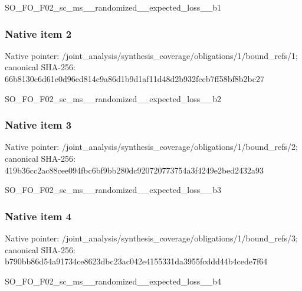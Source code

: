\documentclass[10pt,a4paper]{article}
\begin{document}
\begingroup\raggedright\sloppy SO\_\allowbreak{}FO\_\allowbreak{}F02\_\allowbreak{}sc\_\allowbreak{}ms\_\allowbreak{}\_\allowbreak{}randomized\_\allowbreak{}\_\allowbreak{}expected\_\allowbreak{}loss\_\allowbreak{}\_\allowbreak{}b1\par\endgroup

\subsubsection{Native item 2}
Native pointer: /joint\_\allowbreak{}analysis/synthesis\_\allowbreak{}coverage/obligations/1/bound\_\allowbreak{}refs/1; canonical SHA-256: 66b8130c6d61e0d96ed814c9a86d1b9d1af11d48d2b932fccb7ff58bf8b2bc27

\begingroup\raggedright\sloppy SO\_\allowbreak{}FO\_\allowbreak{}F02\_\allowbreak{}sc\_\allowbreak{}ms\_\allowbreak{}\_\allowbreak{}randomized\_\allowbreak{}\_\allowbreak{}expected\_\allowbreak{}loss\_\allowbreak{}\_\allowbreak{}b2\par\endgroup

\subsubsection{Native item 3}
Native pointer: /joint\_\allowbreak{}analysis/synthesis\_\allowbreak{}coverage/obligations/1/bound\_\allowbreak{}refs/2; canonical SHA-256: 419b36cc2ac88cee094fbc6bf9bb280dc920720773754a3f4249e2bed2432a93

\begingroup\raggedright\sloppy SO\_\allowbreak{}FO\_\allowbreak{}F02\_\allowbreak{}sc\_\allowbreak{}ms\_\allowbreak{}\_\allowbreak{}randomized\_\allowbreak{}\_\allowbreak{}expected\_\allowbreak{}loss\_\allowbreak{}\_\allowbreak{}b3\par\endgroup

\subsubsection{Native item 4}
Native pointer: /joint\_\allowbreak{}analysis/synthesis\_\allowbreak{}coverage/obligations/1/bound\_\allowbreak{}refs/3; canonical SHA-256: b790bb86d54a91734ce8623dbc23ac042e4155331da3955fcddd44b4cede7f64

\begingroup\raggedright\sloppy SO\_\allowbreak{}FO\_\allowbreak{}F02\_\allowbreak{}sc\_\allowbreak{}ms\_\allowbreak{}\_\allowbreak{}randomized\_\allowbreak{}\_\allowbreak{}expected\_\allowbreak{}loss\_\allowbreak{}\_\allowbreak{}b4\par\endgroup
\end{document}
